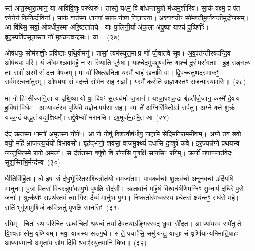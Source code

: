 स्त॑ आत॒स्थुरा॒त्मानं॒ या आ॑विवि॒शुः परुः॑परुः। तास्ते॒ यक्ष्मं॒ वि बा॑धन्तामु॒ग्रो म॑ध्यम॒शीरि॑व। सा॒कं य॑क्ष्म॒ प्र प॑त श्ये॒नेन॑ किकिदी॒विना᳚। सा॒कं वात॑स्य॒ ध्राज्या॑ सा॒कं न॑श्य नि॒हाक॑या। अ॒श्वा॒व॒तीꣳ सो॑मव॒तीमू॒र्जय॑न्ती॒\-मुदो॑जसम्। आ वि॑थ्सि॒ सर्वा॒ ओष॑धीर॒स्मा अ॑रि॒ष्टता॑तये। याः फ॒लिनी॒र्या अ॑फ॒ला अ॑पु॒ष्पा याश्च॑ पु॒ष्पिणीः᳚। बृह॒स्पति॑प्रसूता॒स्ता नो॑ मुञ्च॒न्त्वꣳह॑सः। या~-~(२७)\ip

ओष॑धयः॒ सोम॑राज्ञीः॒ प्रवि॑ष्टाः पृथि॒वीमनु॑। तासां॒ त्वम॑स्युत्त॒मा प्र णो॑ जी॒वात॑वे सुव। अ॒व॒पत॑न्तीरवदन्दि॒व ओष॑धयः॒ परि॑। यं जी॒वम॒श्ञवा॑महै॒ न स रि॑ष्याति॒ पूरु॑षः। याश्चे॒दमु॑पशृ॒ण्वन्ति॒ याश्च॑ दू॒रं परा॑गताः। इ॒ह स॒ङ्गत्य॒ ताः सर्वा॑ अ॒स्मै सं द॑त्त भेष॒जम्। मा वो॑ रिषत्खनि॒ता यस्मै॑ चा॒हं खना॑मि वः। द्वि॒पच्चतु॑ष्पद॒स्माक॒ꣳ॒ सर्व॑म॒स्त्वना॑तुरम्। ओष॑धयः॒ सं व॑दन्ते॒ सोमे॑न स॒ह राज्ञा᳚। यस्मै॑ क॒रोति॑ ब्राह्म॒णस्तꣳ रा॑जन्पारयामसि॥~(२८)\ip

{\anuvakamend[{रपः॑ पत॒त्रिणी॒र्या अꣳह॑सो॒ याः खना॑मि वो॒\-ऽष्टाद॑श च}]}

मा नो॑ हिꣳसीज्जनि॒ता यः पृ॑थि॒व्या यो वा॒ दिवꣳ॑ स॒त्यध॑र्मा ज॒जान॑। यश्चा॒पश्च॒न्द्रा बृ॑ह॒तीर्ज॒जान॒ कस्मै॑ दे॒वाय॑ ह॒विषा॑ विधेम। अ॒भ्याव॑र्तस्व पृथिवि य॒ज्ञेन॒ पय॑सा स॒ह। व॒पां ते॑ अ॒ग्निरि॑षि॒तो\-ऽव॑ सर्पतु। अग्ने॒ यत्ते॑ शु॒क्रं यच्च॒न्द्रं यत्पू॒तं यद्य॒ज्ञियम्᳚। तद्दे॒वेभ्यो॑ भरामसि। इष॒मूर्ज॑म॒हमि॒त आ~(२९)\ip

द॑द ऋ॒तस्य॒ धाम्नो॑ अ॒मृत॑स्य॒ योनेः᳚। आ नो॒ गोषु॑ विश॒त्वौष॑धीषु॒ जहा॑मि से॒दिमनि॑रा॒ममी॑वाम्। अग्ने॒ तव॒ श्रवो॒ वयो॒ महि॑ भ्राजन्त्य॒र्चयो॑ विभावसो। बृह॑द्भानो॒ शव॑सा॒ वाज॑मु॒क्थ्यं॑ दधा॑सि दा॒शुषे॑ कवे। इ॒र॒ज्यन्न॑ग्ने प्रथयस्व ज॒न्तुभि॑र॒स्मे रायो॑ अमर्त्य। स द॑र्\mbox{}श॒तस्य॒ वपु॑षो॒ वि रा॑जसि पृ॒णक्षि॑ सान॒सिꣳ र॒यिम्। ऊर्जो॑ नपा॒ज्जात॑वेदः सुश॒स्तिभि॒र्मन्द॑स्व~(३०)\ip

धी॒तिभि॑र्हि॒तः। त्वे इषः॒ सं द॑धु॒र्भूरि॑रेतसश्चि॒त्रोत॑यो वा॒मजा॑ताः। पा॒व॒कव॑र्चाः शु॒क्रव॑र्चा॒ अनू॑नवर्चा॒ उदि॑यर्\mbox{}षि भा॒नुना᳚। पु॒त्रः पि॒तरा॑ वि॒चर॒न्नुपा॑वस्यु॒भे पृ॑णक्षि॒ रोद॑सी। ऋ॒तावा॑नं महि॒षं वि॒श्वच॑र्\mbox{}षणिम॒ग्निꣳ सु॒म्नाय॑ दधिरे पु॒रो जनाः᳚। श्रुत्क॑र्णꣳ स॒प्रथ॑स्तमं त्वा गि॒रा दैव्यं॒ मानु॑षा यु॒गा। नि॒ष्क॒र्तार॑मध्व॒रस्य॒ प्रचे॑तसं॒ क्षय॑न्त॒ꣳ॒ राध॑से म॒हे। रा॒तिं भृगू॑णामु॒शिजं॑ क॒विक्र॑तुं पृ॒णक्षि॑ सान॒सिꣳ~(३१)\ip

र॒यिम्। चितः॑ स्थ परि॒चित॑ ऊर्ध्व॒चितः॑ श्रयध्वं॒ तया॑ दे॒वत॑या\-ऽ\-ङ्गिर॒स्वद् ध्रु॒वाः सी॑दत। आ प्या॑यस्व॒ समे॑तु ते वि॒श्वतः॑ सोम॒ वृष्णि॑यम्। भवा॒ वाज॑स्य सङ्ग॒थे। सं ते॒ पयाꣳ॑सि॒ समु॑ यन्तु॒ वाजाः॒ सं वृष्णि॑यान्यभिमाति॒षाहः॑। आ॒प्याय॑मानो अ॒मृता॑य सोम दि॒वि श्रवाꣴ॑स्युत्त॒मानि॑ धिष्व॥~(३२)\ip


